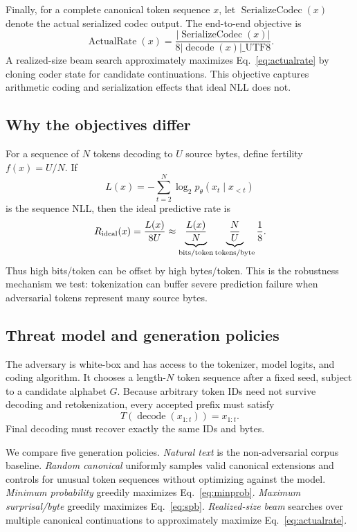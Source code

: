 \documentclass{article}
\newcommand{\bytes}[1]{\lvert #1\rvert\_{\mathrm{UTF8}}}
\begin{document}
Finally, for a complete canonical token sequence $x$, let
$\operatorname{SerializeCodec}(x)$ denote the actual serialized codec output. The
end-to-end objective is
\begin{equation}
  \operatorname{ActualRate}(x)=
  \frac{\left|\operatorname{SerializeCodec}(x)\right|}
       {8\bytes{\operatorname{decode}(x)}}.
  \label{eq:actualrate}
\end{equation}
A realized-size beam search approximately maximizes Eq.~\ref{eq:actualrate} by
cloning coder state for candidate continuations. This objective captures arithmetic
coding and serialization effects that ideal NLL does not.

\subsection{Why the objectives differ}
For a sequence of $N$ tokens decoding to $U$ source bytes, define fertility
$f(x)=U/N$. If
\begin{equation}
  L(x)=-\sum_{t=2}^{N}\log_2 p_\theta(x_t\mid x_{<t})
\end{equation}
is the sequence NLL, then the ideal predictive rate is
\begin{equation}
  R_{\rm ideal}(x)=\frac{L(x)}{8U}
  \approx
  \underbrace{\frac{L(x)}{N}}_{\text{bits/token}}
  \underbrace{\frac{N}{U}}_{\text{tokens/byte}}
  \frac{1}{8}.
  \label{eq:factorization}
\end{equation}
Thus high bits/token can be offset by high bytes/token. This is the robustness
mechanism we test: tokenization can buffer severe prediction failure when
adversarial tokens represent many source bytes.

\subsection{Threat model and generation policies}
The adversary is white-box and has access to the tokenizer, model logits, and coding
algorithm. It chooses a length-$N$ token sequence after a fixed seed, subject to a
candidate alphabet $G$. Because arbitrary token IDs need not survive decoding and
retokenization, every accepted prefix must satisfy
\begin{equation}
  T(\operatorname{decode}(x_{1:t}))=x_{1:t}.
  \label{eq:canonical}
\end{equation}
Final decoding must recover exactly the same IDs and bytes.

We compare five generation policies. \emph{Natural text} is the non-adversarial
corpus baseline. \emph{Random canonical} uniformly samples valid canonical
extensions and controls for unusual token sequences without optimizing against the
model. \emph{Minimum probability} greedily maximizes Eq.~\ref{eq:minprob}.
\emph{Maximum surprisal/byte} greedily maximizes Eq.~\ref{eq:spb}.
\emph{Realized-size beam} searches over multiple canonical continuations to
approximately maximize Eq.~\ref{eq:actualrate}.
\end{document}
